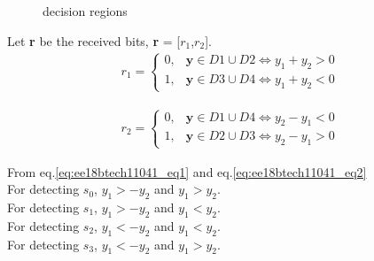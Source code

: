 \begin{enumerate}[label=\thesubsection.\arabic*.,ref=\thesubsection.\theenumi]
\begin{figure}[!ht]

                \resizebox{\columnwidth}{!}{}

\label{fig:ee18btech11041_fig2}
\caption{decision regions}
	
\end{figure}

Let \textbf{r} be the received bits, \textbf{r} = [$r_1$,$r_2$]. 
\begin{align}
    r_1 = 
    \begin{cases}
    0, &  \textbf{y} \in D1\cup D2 \Longleftrightarrow  y_1 + y_2 > 0\\
    1, &  \textbf{y} \in D3\cup D4 \Longleftrightarrow  y_1 + y_2 < 0
    \end{cases}
    \label{eq:ee18btech11041_eq1}
\end{align}

\begin{align}
    r_2 = 
    \begin{cases}
    0, &  \textbf{y} \in D1\cup D4 \Longleftrightarrow  y_2 - y_1 < 0\\
    1, &  \textbf{y} \in D2\cup D3 \Longleftrightarrow  y_2 - y_1 > 0
    \end{cases}
    \label{eq:ee18btech11041_eq2}
\end{align}

From eq.\ref{eq:ee18btech11041_eq1} and eq.\ref{eq:ee18btech11041_eq2}
\\
For detecting $s_0$, $y_1 > -y_2$ and $y_1 > y_2$.
\\
For detecting $s_1$, $y_1>-y_2$ and $y_1<y_2$.
\\
For detecting $s_2$,  $y_1<-y_2$ and $y_1<y_2$.
\\
For detecting $s_3$, $y_1<-y_2$ and $y_1>y_2$.























\end{enumerate}
